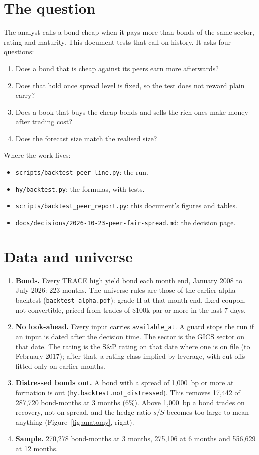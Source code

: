 \documentclass[11pt,a4paper]{article}
\newcommand{\code}[1]{\texttt{\small #1}}
\begin{document}
\section{The question}
The analyst calls a bond cheap when it pays more than bonds of the same sector, rating and maturity. This document tests that call on history. It asks four questions:
\begin{enumerate}
\item Does a bond that is cheap against its peers earn more afterwards?
\item Does that hold once spread level is fixed, so the test does not reward plain carry?
\item Does a book that buys the cheap bonds and sells the rich ones make money after trading cost?
\item Does the forecast size match the realised size?
\end{enumerate}
Where the work lives:
\begin{itemize}
\item \code{scripts/backtest\_peer\_line.py}: the run.
\item \code{hy/backtest.py}: the formulas, with tests.
\item \code{scripts/backtest\_peer\_report.py}: this document's figures and tables.
\item \code{docs/decisions/2026-10-23-peer-fair-spread.md}: the decision page.
\end{itemize}

\section{Data and universe}
\begin{enumerate}
\item \textbf{Bonds.} Every TRACE high yield bond each month end, January 2008 to July 2026: 223 months. The universe rules are those of the earlier alpha backtest (\code{backtest\_alpha.pdf}): grade H at that month end, fixed coupon, not convertible, priced from trades of \$100k par or more in the last 7 days.
\item \textbf{No look-ahead.} Every input carries \code{available\_at}. A guard stops the run if an input is dated after the decision time. The sector is the GICS sector on that date. The rating is the S\&P rating on that date where one is on file (to February 2017); after that, a rating class implied by leverage, with cut-offs fitted only on earlier months.
\item \textbf{Distressed bonds out.} A bond with a spread of 1{,}000~bp or more at formation is out (\code{hy.backtest.not\_distressed}). This removes 17{,}442 of 287{,}720 bond-months at 3 months (6\%). Above 1{,}000~bp a bond trades on recovery, not on spread, and the hedge ratio $s/S$ becomes too large to mean anything (Figure~\ref{fig:anatomy}, right).
\item \textbf{Sample.} 270{,}278 bond-months at 3 months, 275{,}106 at 6 months and 556{,}629 at 12 months.
\end{enumerate}
\end{document}
